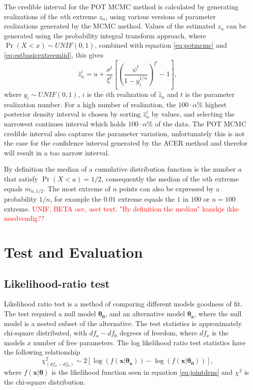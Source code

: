The credible interval for the POT MCMC method is calculated by generating realizations of the $n$th extreme $z_n$, using various versions of parameter realizations generated by the MCMC method. Values of the estimated $z_n$ can be generated using the probability integral transform approach, where $\Pr(X < x) \sim UNIF(0,1)$, combined with equation \eqref{eq:potmcmc} and \eqref{eq:estbasicextreemiid}, this gives
\begin{equation}
\hat{z}_n^{i}=u+\frac{\sigma^t}{\xi^t} \left[ \left( \frac{\psi^t}{1-y_{i}^{1/n}}\right)^{\xi^t} -1 \right],
\end{equation}
where $y_{i}\sim UNIF(0,1)$, $i$ is the $i$th realization of $\hat{z}_n$ and $t$ is the parameter realization number. For a high number of realization, the $100 \cdot \alpha \%$ highest posterior density interval is chosen by sorting $\hat{z}_n^i$ by values, and selecting the narrowest continues interval which holds $100 \cdot \alpha \%$ of the data.
The POT MCMC credible interval also captures the parameter variation, unfortunately this is not the case for the confidence interval generated by the ACER method and therefor will result in a too narrow interval.

By definition the median of a cumulative distribution function is the number $a$ that satisfy $\Pr(X<a)=1/2$, consequently the median of the $n$th extreme equals $m_{n,1/2}$.
The most extreme of $n$ points can also be expressed by a probability $1/n$, for example the $0.01$ extreme equals the $1$ in $100$ or $n=100$ extreme.
\textcolor{red}{UNIF, BETA osv, uset text{}. "By definition the median" kanskje ikke noedvendig??}

\section{Test and Evaluation}
\subsection{Likelihood-ratio test}
Likelihood ratio test is a method of comparing different models goodness of fit. The test required a null model $ \boldsymbol{\theta_0}$, and an alternative model $\boldsymbol{\theta_a}$, where the null model is a nested subset of the alternative. The test statistics is approximately chi-square distributed, with $df_a-df_0$ degrees of freedom, where $df_x$ is the models $x$ number of free parameters. The log likelihood ratio test statistics have the following relationship
\begin{equation}
\label{eq:loglikratiotest}
\chi_{(df_a-df_0)}^{2} \sim 2 \left[ \log \left( f(\boldsymbol{x}|\boldsymbol{\theta_a})\right) - \log \left( f(\boldsymbol{x}|\boldsymbol{\theta_0}) \right) \right],
\end{equation}
where $f(\boldsymbol{x}|\boldsymbol{\theta})$ is the likelihood function seen in equation \eqref{eq:jointdens} and $\chi^2$ is the chi-square distribution. 

